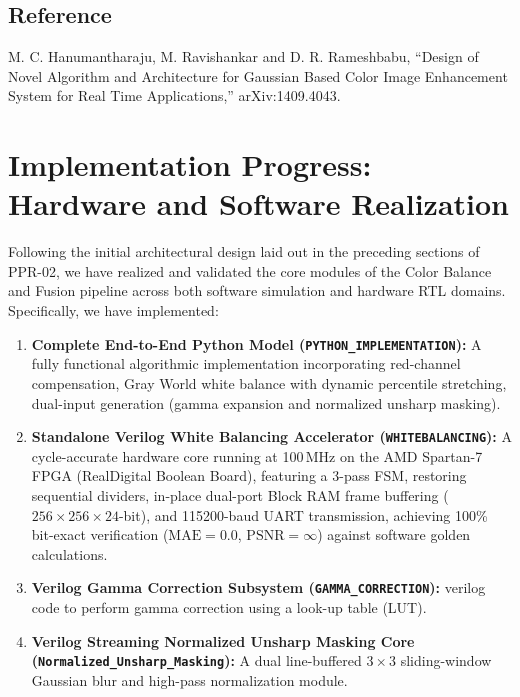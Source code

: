 \documentclass[10pt,twocolumn,letterpaper]{article}
\begin{document}
\subsection{Reference}
M. C. Hanumantharaju, M. Ravishankar and D. R. Rameshbabu,
``Design of Novel Algorithm and Architecture for Gaussian Based Color Image Enhancement System for Real Time Applications,'' arXiv:1409.4043.



{\color{updateblue}

\section{Implementation Progress: Hardware and Software Realization}
\label{sec:progress_implementation}

Following the initial architectural design laid out in the preceding sections of PPR-02, we have realized and validated the core modules of the Color Balance and Fusion pipeline across both software simulation and hardware RTL domains. Specifically, we have implemented:
\begin{enumerate}
    \item \textbf{Complete End-to-End Python Model (\texttt{PYTHON\_IMPLEMENTATION}):} A fully functional algorithmic implementation incorporating red-channel compensation, Gray World white balance with dynamic percentile stretching, dual-input generation (gamma expansion and normalized unsharp masking).
    \item \textbf{Standalone Verilog White Balancing Accelerator (\texttt{WHITEBALANCING}):} A cycle-accurate hardware core running at 100\,MHz on the AMD Spartan-7 FPGA (RealDigital Boolean Board), featuring a 3-pass FSM, restoring sequential dividers, in-place dual-port Block RAM frame buffering ($256\times256\times24$-bit), and 115200-baud UART transmission, achieving 100\% bit-exact verification ($\text{MAE}=0.0$, $\text{PSNR}=\infty$) against software golden calculations.
    \item \textbf{Verilog Gamma Correction Subsystem (\texttt{GAMMA\_CORRECTION}):} verilog code to perform gamma correction using a look-up table (LUT).
    \item \textbf{Verilog Streaming Normalized Unsharp Masking Core (\texttt{Normalized\_Unsharp\_Masking}):} A dual line-buffered $3\times3$ sliding-window Gaussian blur and high-pass normalization module.
\end{enumerate}

}
\end{document}

